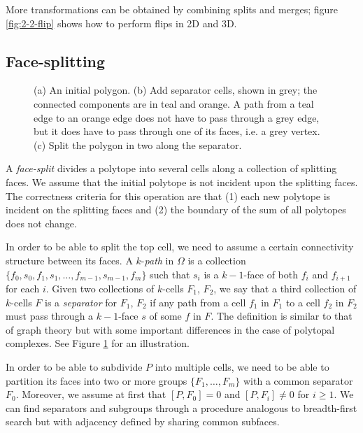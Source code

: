\documentclass[twocolumn,leqno,twocolumn]{article}
\begin{document}
More transformations can be obtained by combining splits and merges; figure \ref{fig:2-2-flip} shows how to perform flips in 2D and 3D.

\subsection{Face-splitting}

\begin{figure}[t]
    \begin{center}
        
    \end{center}
    \caption{(a) An initial polygon.
    (b) Add separator cells, shown in grey; the connected components are in teal and orange.
    A path from a teal edge to an orange edge does not have to pass through a grey edge, but it does have to pass through one of its faces, i.e. a grey vertex.
    (c) Split the polygon in two along the separator.}
    \label{fig:separator}
\end{figure}

A \emph{face-split} divides a polytope into several cells along a collection of splitting faces.
We assume that the initial polytope is not incident upon the splitting faces.
The correctness criteria for this operation are that (1) each new polytope is incident on the splitting faces and (2) the boundary of the sum of all polytopes does not change.

In order to be able to split the top cell, we need to assume a certain connectivity structure between its faces.
A $k$-\emph{path} in $\Omega$ is a collection $\{f_0, s_0, f_1, s_1, \ldots, f_{m - 1}, s_{m - 1}, f_m\}$ such that $s_i$ is a $k - 1$-face of both $f_i$ and $f_{i + 1}$ for each $i$.
Given two collections of $k$-cells $F_1$, $F_2$, we say that a third collection of $k$-cells $F$ is a \emph{separator} for $F_1$, $F_2$ if any path from a cell $f_1$ in $F_1$ to a cell $f_2$ in $F_2$ must pass through a $k - 1$-face $s$ of some $f$ in $F$.
The definition is similar to that of graph theory but with some important differences in the case of polytopal complexes.
See Figure \ref{fig:separator} for an illustration.

In order to be able to subdivide $P$ into multiple cells, we need to be able to partition its faces into two or more groups $\{F_1, \ldots, F_m\}$ with a common separator $F_0$.
Moreover, we assume at first that $[P, F_0] = 0$ and $[P, F_i] \neq 0$ for $i \ge 1$.
We can find separators and subgroups through a procedure analogous to breadth-first search but with adjacency defined by sharing common subfaces.
\end{document}

